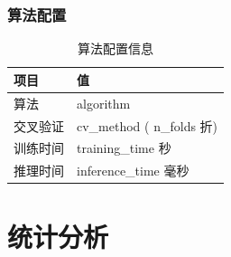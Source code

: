 \documentclass[12pt,a4paper]{article}
\begin{document}
\subsubsection{算法配置}
\begin{table}[H]
    \centering
    \begin{tabular}{ll}
        \toprule
        项目 & 值 \\
        \midrule
        算法 & {{ algorithm }} \\
        交叉验证 & {{ cv_method }} ({{ n_folds }}折) \\
        训练时间 & {{ training_time }}秒 \\
        推理时间 & {{ inference_time }}毫秒 \\
        \bottomrule
    \end{tabular}
    \caption{算法配置信息}
\end{table}

\section{统计分析}
\end{document}
